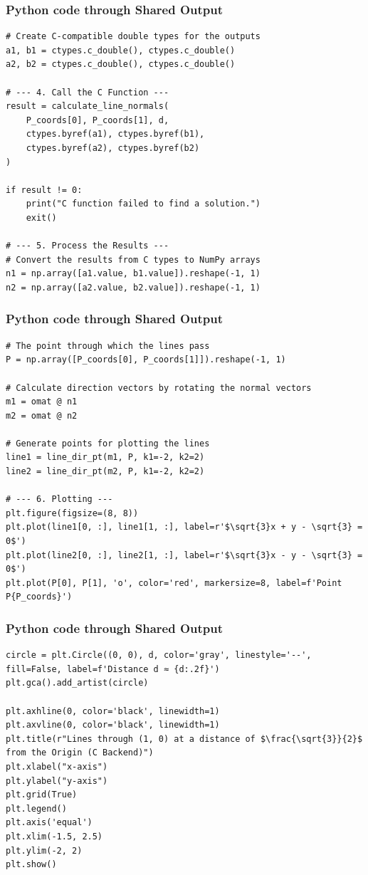 \documentclass{beamer}
\begin{document}
\begin{frame}[fragile]
\frametitle{Python code through Shared Output }
\begin{lstlisting}
# Create C-compatible double types for the outputs
a1, b1 = ctypes.c_double(), ctypes.c_double()
a2, b2 = ctypes.c_double(), ctypes.c_double()

# --- 4. Call the C Function ---
result = calculate_line_normals(
    P_coords[0], P_coords[1], d,
    ctypes.byref(a1), ctypes.byref(b1),
    ctypes.byref(a2), ctypes.byref(b2)
)

if result != 0:
    print("C function failed to find a solution.")
    exit()

# --- 5. Process the Results ---
# Convert the results from C types to NumPy arrays
n1 = np.array([a1.value, b1.value]).reshape(-1, 1)
n2 = np.array([a2.value, b2.value]).reshape(-1, 1)
\end{lstlisting}    
\end{frame}
\begin{frame}[fragile]
\frametitle{Python code through Shared Output }
\begin{lstlisting}
# The point through which the lines pass
P = np.array([P_coords[0], P_coords[1]]).reshape(-1, 1)

# Calculate direction vectors by rotating the normal vectors
m1 = omat @ n1
m2 = omat @ n2

# Generate points for plotting the lines
line1 = line_dir_pt(m1, P, k1=-2, k2=2)
line2 = line_dir_pt(m2, P, k1=-2, k2=2)

# --- 6. Plotting ---
plt.figure(figsize=(8, 8))
plt.plot(line1[0, :], line1[1, :], label=r'$\sqrt{3}x + y - \sqrt{3} = 0$')
plt.plot(line2[0, :], line2[1, :], label=r'$\sqrt{3}x - y - \sqrt{3} = 0$')
plt.plot(P[0], P[1], 'o', color='red', markersize=8, label=f'Point P{P_coords}')
\end{lstlisting}    
\end{frame}
\begin{frame}[fragile]
\frametitle{Python code through Shared Output }
\begin{lstlisting}
circle = plt.Circle((0, 0), d, color='gray', linestyle='--', fill=False, label=f'Distance d ≈ {d:.2f}')
plt.gca().add_artist(circle)

plt.axhline(0, color='black', linewidth=1)
plt.axvline(0, color='black', linewidth=1)
plt.title(r"Lines through (1, 0) at a distance of $\frac{\sqrt{3}}{2}$ from the Origin (C Backend)")
plt.xlabel("x-axis")
plt.ylabel("y-axis")
plt.grid(True)
plt.legend()
plt.axis('equal')
plt.xlim(-1.5, 2.5)
plt.ylim(-2, 2)
plt.show()
\end{lstlisting}    
\end{frame}
\end{document}
